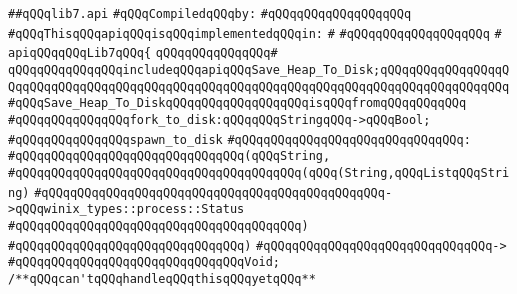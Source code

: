 \label{src/lib/std/src/nj/lib7.api}
\verb|##qQQqlib7.api|\newline
\newline
\verb|#qQQqCompiledqQQqby:|\newline
\verb|#qQQqqQQqqQQqqQQqqQQq|\newline
\newline
\newline
\verb|#qQQqThisqQQqapiqQQqisqQQqimplementedqQQqin:|\newline
\verb|#|\newline
\verb|#qQQqqQQqqQQqqQQqqQQq|\newline
\verb|#|\newline
\verb|apiqQQqqQQqLib7qQQq{|\newline
\verb|qQQqqQQqqQQqqQQq#|\newline
\verb|qQQqqQQqqQQqqQQqincludeqQQqapiqQQqSave_Heap_To_Disk;qQQqqQQqqQQqqQQqqQQqqQQqqQQqqQQqqQQqqQQqqQQqqQQqqQQqqQQqqQQqqQQqqQQqqQQqqQQqqQQqqQQqqQQq#qQQqSave_Heap_To_DiskqQQqqQQqqQQqqQQqqQQqisqQQqfromqQQqqQQqqQQq|\newline
\newline
\verb|#qQQqqQQqqQQqqQQqfork_to_disk:qQQqqQQqStringqQQq->qQQqBool;|\newline
\newline
\verb|#qQQqqQQqqQQqqQQqspawn_to_disk|\newline
\verb|#qQQqqQQqqQQqqQQqqQQqqQQqqQQqqQQq:|\newline
\verb|#qQQqqQQqqQQqqQQqqQQqqQQqqQQqqQQq(qQQqString,|\newline
\verb|#qQQqqQQqqQQqqQQqqQQqqQQqqQQqqQQqqQQqqQQq(qQQq(String,qQQqListqQQqString)|\newline
\verb|#qQQqqQQqqQQqqQQqqQQqqQQqqQQqqQQqqQQqqQQqqQQqqQQq->qQQqwinix_types::process::Status|\newline
\verb|#qQQqqQQqqQQqqQQqqQQqqQQqqQQqqQQqqQQqqQQq)|\newline
\verb|#qQQqqQQqqQQqqQQqqQQqqQQqqQQqqQQq)|\newline
\verb|#qQQqqQQqqQQqqQQqqQQqqQQqqQQqqQQq->|\newline
\verb|#qQQqqQQqqQQqqQQqqQQqqQQqqQQqqQQqVoid;|\newline
\newline
\verb|/**qQQqcan'tqQQqhandleqQQqthisqQQqyetqQQq**|\newline
